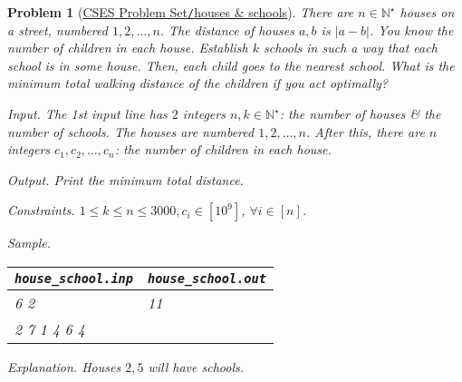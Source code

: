 \documentclass{article}
\newtheorem{problem}{Problem}
\begin{document}
\begin{problem}[\href{https://cses.fi/problemset/task/2087}{CSES Problem Set{\tt/}houses \& schools}]
    There are $n\in\mathbb{N}^\star$ houses on a street, numbered $1,2,\ldots,n$. The distance of houses $a,b$ is $|a - b|$. You know the number of children in each house. Establish $k$ schools in such a way that each school is in some house. Then, each child goes to the nearest school. What is the minimum total walking distance of the children if you act optimally?
    \item {\sf Input.} The 1st input line has $2$ integers $n,k\in\mathbb{N}^\star$: the number of houses \& the number of schools. The houses are numbered $1,2,\ldots,n$. After this, there are $n$ integers $c_1,c_2,\ldots,c_n$: the number of children in each house.
    \item {\sf Output.} Print the minimum total distance.
    \item {\sf Constraints.} $1\le k\le n\le3000,c_i\in[10^9]$, $\forall i\in[n]$.
    \item {\sf Sample.}
    \begin{table}[H]
        \centering
        \begin{tabular}{|l|l|}
            \hline
            \verb|house_school.inp| & \verb|house_school.out| \\
            \hline
            6 2 & 11 \\
            2 7 1 4 6 4 & \\
            \hline
        \end{tabular}
    \end{table}
    \item {\sf Explanation.} Houses $2,5$ will have schools.
\end{problem}
\end{document}
